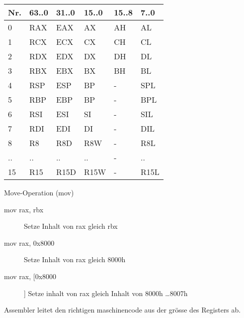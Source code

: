 \begin{multicols*}{4}
    \begin{tabular}{llllll}
      Nr. & 63..0 & 31..0 & 15..0 & 15..8 & 7..0\\
      \hline
      0 & RAX & EAX & AX & AH & AL\\
      1 & RCX & ECX & CX & CH & CL\\
      2 & RDX & EDX & DX & DH & DL\\
      3 & RBX & EBX & BX & BH & BL\\
      \hline
      4 & RSP & ESP & BP & - & SPL\\
      5 & RBP & EBP & BP & - & BPL\\
      6 & RSI & ESI & SI & - & SIL\\
      7 & RDI & EDI & DI & - & DIL\\
      \hline
      8 & R8 & R8D & R8W & - & R8L\\
      .. & .. & .. & .. & - & ..\\
      15 & R15 & R15D & R15W & - & R15L
    \end{tabular}

    Move-Operation (mov)
    \begin{description}
        \item[mov rax, rbx] Setze Inhalt von rax gleich rbx
        \item[mov rax, 0x8000] Setze Inhalt von rax gleich 8000h
        \item[mov rax, [0x8000]] Setze inhalt von rax gleich Inhalt von 8000h \dots 8007h
    \end{description}

    Assembler leitet den richtigen maschinencode aus der grösse des Registers ab.


\end{multicols*}
